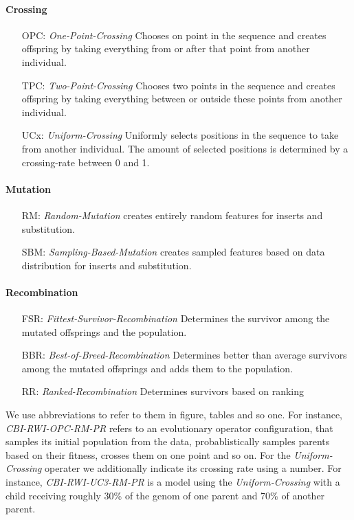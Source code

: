 \documentclass[./../../paper.tex]{subfiles}
\begin{document}
\paragraph{Crossing}
\begin{enumerate}
    \item[OPC:] \emph{One-Point-Crossing} Chooses on point in the sequence and creates offspring by taking everything from or after that point from another individual. 
    \item[TPC:] \emph{Two-Point-Crossing} Chooses two points in the sequence and creates offspring by taking everything between or outside these points from another individual. 
    \item[UCx:] \emph{Uniform-Crossing} Uniformly selects positions in the sequence to take from another individual. The amount of selected positions is determined by a crossing-rate between 0 and 1.
\end{enumerate}
\paragraph{Mutation}
\begin{enumerate}
    \item[RM:] \emph{Random-Mutation} creates entirely random features for inserts and substitution. 
    \item[SBM:] \emph{Sampling-Based-Mutation} creates sampled features based on data distribution for inserts and substitution. 
\end{enumerate}
\paragraph{Recombination}
\begin{enumerate}
    \item[FSR:] \emph{Fittest-Survivor-Recombination} Determines the survivor among the mutated offsprings and the population. 
    \item[BBR:] \emph{Best-of-Breed-Recombination} Determines better than average survivors among the mutated offsprings and adds them to the population. 
    \item[RR:] \emph{Ranked-Recombination} Determines survivors based on ranking 
\end{enumerate}


We use abbreviations to refer to them in figure, tables and so one. For instance, \emph{CBI-RWI-OPC-RM-PR} refers to an evolutionary operator configuration, that samples its initial population from the data, probablistically samples parents based on their fitness, crosses them on one point and so on. For the \emph{Uniform-Crossing} operater we additionally indicate its crossing rate using a number. For instance,  \emph{CBI-RWI-UC3-RM-PR} is a model using the \emph{Uniform-Crossing} with a child receiving roughly 30\% of the genom of one parent and 70\% of another parent.
\end{document}
